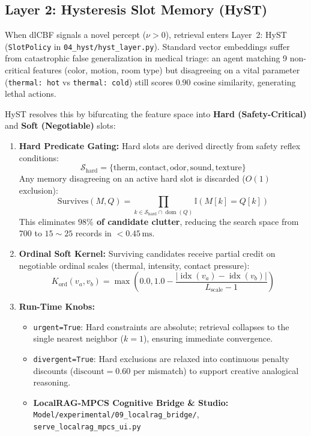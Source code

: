 \documentclass[10pt,twocolumn,letterpaper]{article}
\begin{document}
\subsection{Layer 2: Hysteresis Slot Memory (HyST)}
When dlCBF signals a novel percept ($\nu > 0$), retrieval enters Layer~2: HyST (\texttt{SlotPolicy} in \texttt{04\_hyst/hyst\_layer.py}). Standard vector embeddings suffer from catastrophic false generalization in medical triage: an agent matching 9 non-critical features (color, motion, room type) but disagreeing on a vital parameter (\texttt{thermal: hot} vs \texttt{thermal: cold}) still scores $0.90$ cosine similarity, generating lethal actions.

HyST resolves this by bifurcating the feature space into \textbf{Hard (Safety-Critical)} and \textbf{Soft (Negotiable)} slots:
\begin{enumerate}
  \item \textbf{Hard Predicate Gating:} Hard slots are derived directly from safety reflex conditions:
  \begin{equation}
    \mathcal{S}_{\text{hard}} = \{\text{therm}, \text{contact}, \text{odor}, \text{sound}, \text{texture}\}
  \end{equation}
  Any memory disagreeing on an active hard slot is discarded ($O(1)$ exclusion):
  \begin{equation}
    \text{Survives}(M, Q) = \prod_{k \in \mathcal{S}_{\text{hard}} \cap \operatorname{dom}(Q)} \mathbb{I}\left(M[k] = Q[k]\right)
  \end{equation}
  This eliminates \textbf{$98\%$ of candidate clutter}, reducing the search space from $700$ to $15 \sim 25$ records in $<0.45\,\text{ms}$.
  \item \textbf{Ordinal Soft Kernel:} Surviving candidates receive partial credit on negotiable ordinal scales (thermal, intensity, contact pressure):
  \begin{equation}
    K_{\text{ord}}(v_a, v_b) = \max\left(0.0, 1.0 - \frac{|\operatorname{idx}(v_a) - \operatorname{idx}(v_b)|}{L_{\text{scale}} - 1}\right)
  \end{equation}
  \item \textbf{Run-Time Knobs:}
  \begin{itemize}
    \item \texttt{urgent=True}: Hard constraints are absolute; retrieval collapses to the single nearest neighbor ($k=1$), ensuring immediate convergence.
    \item \texttt{divergent=True}: Hard exclusions are relaxed into continuous penalty discounts ($\text{discount} = 0.60$ per mismatch) to support creative analogical reasoning.
  \item \textbf{LocalRAG-MPCS Cognitive Bridge \& Studio:} \nolinkurl{Model/experimental/09_localrag_bridge/}, \nolinkurl{serve_localrag_mpcs_ui.py}
  \end{itemize}
\end{enumerate}
\end{document}
